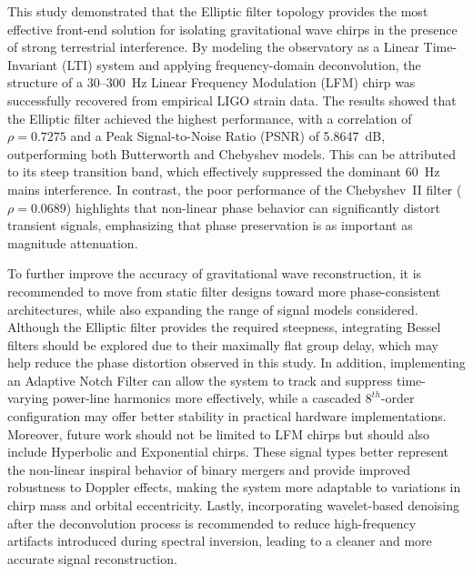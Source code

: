This study demonstrated that the Elliptic filter topology provides the most effective front-end solution for isolating gravitational wave chirps in the presence of strong terrestrial interference. By modeling the observatory as a Linear Time-Invariant (LTI) system and applying frequency-domain deconvolution, the structure of a 30--300~Hz Linear Frequency Modulation (LFM) chirp was successfully recovered from empirical LIGO strain data. The results showed that the Elliptic filter achieved the highest performance, with a correlation of $\rho = 0.7275$ and a Peak Signal-to-Noise Ratio (PSNR) of 5.8647~dB, outperforming both Butterworth and Chebyshev models. This can be attributed to its steep transition band, which effectively suppressed the dominant 60~Hz mains interference. In contrast, the poor performance of the Chebyshev~II filter ($\rho = 0.0689$) highlights that non-linear phase behavior can significantly distort transient signals, emphasizing that phase preservation is as important as magnitude attenuation.

To further improve the accuracy of gravitational wave reconstruction, it is recommended to move from static filter designs toward more phase-consistent architectures, while also expanding the range of signal models considered. Although the Elliptic filter provides the required steepness, integrating Bessel filters should be explored due to their maximally flat group delay, which may help reduce the phase distortion observed in this study. In addition, implementing an Adaptive Notch Filter can allow the system to track and suppress time-varying power-line harmonics more effectively, while a cascaded $8^{th}$-order configuration may offer better stability in practical hardware implementations. Moreover, future work should not be limited to LFM chirps but should also include Hyperbolic and Exponential chirps. These signal types better represent the non-linear inspiral behavior of binary mergers and provide improved robustness to Doppler effects, making the system more adaptable to variations in chirp mass and orbital eccentricity. Lastly, incorporating wavelet-based denoising after the deconvolution process is recommended to reduce high-frequency artifacts introduced during spectral inversion, leading to a cleaner and more accurate signal reconstruction.